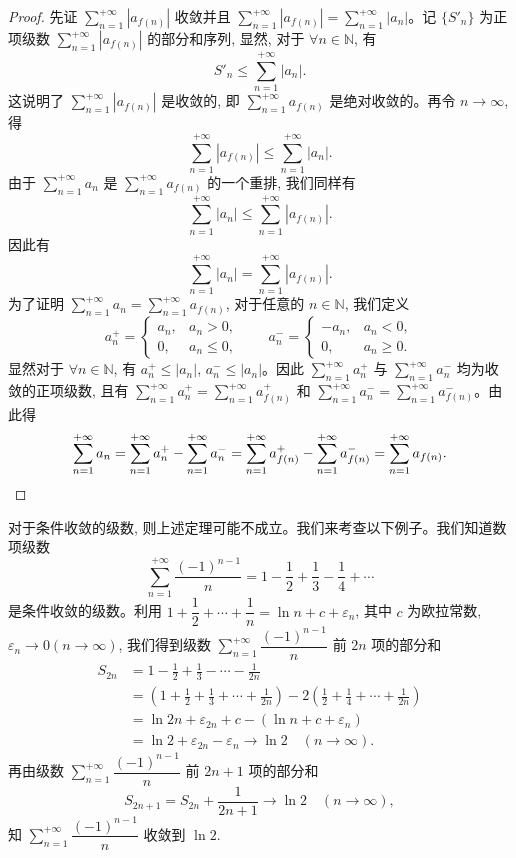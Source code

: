\begin{proof}
先证 $\sum\limits_{n=1}^{+\infty}|a_{f(n)}|$ 收敛并且 $\sum\limits_{n=1}^{+\infty}|a_{f(n)}|=\sum\limits_{n=1}^{+\infty}|a_n|$。记 $\{S'_n\}$ 为正项级数 $\sum\limits_{n=1}^{+\infty}|a_{f(n)}|$ 的部分和序列, 显然, 对于 $\forall n\in\mathbb{N}$, 有
\[
  S'_n\leq\sum_{n=1}^{+\infty}|a_n|.
\]
这说明了 $\sum\limits_{n=1}^{+\infty}|a_{f(n)}|$ 是收敛的, 即 $\sum\limits_{n=1}^{+\infty}a_{f(n)}$ 是绝对收敛的。再令 $n\to\infty$, 得
\[
  \sum_{n=1}^{+\infty}|a_{f(n)}|\leq\sum_{n=1}^{+\infty}|a_n|.
\]
由于 $\sum\limits_{n=1}^{+\infty}a_n$ 是 $\sum\limits_{n=1}^{+\infty}a_{f(n)}$ 的一个重排, 我们同样有
\[
  \sum_{n=1}^{+\infty}|a_n|\leq\sum_{n=1}^{+\infty}|a_{f(n)}|.
\]
因此有
\[
  \sum_{n=1}^{+\infty}|a_n|=\sum_{n=1}^{+\infty}|a_{f(n)}|.
\]
为了证明 $\sum\limits_{n=1}^{+\infty}a_n=\sum\limits_{n=1}^{+\infty}a_{f(n)}$, 对于任意的 $n\in\mathbb{N}$, 我们定义
\begin{equation}
  a_n^+=
  \begin{cases}
    a_n, & a_n>0,\\
    0, & a_n\leq0,
  \end{cases}
  \qquad
  a_n^-=
  \begin{cases}
    -a_n, & a_n<0,\\
    0, & a_n\geq0.
  \end{cases}
  \label{eq:ma-9-4-1}
\end{equation}
显然对于 $\forall n\in\mathbb{N}$, 有 $a_n^+\leq|a_n|$, $a_n^-\leq|a_n|$。因此 $\sum\limits_{n=1}^{+\infty}a_n^+$ 与 $\sum\limits_{n=1}^{+\infty}a_n^-$ 均为收敛的正项级数, 且有 $\sum\limits_{n=1}^{+\infty}a_n^+=\sum\limits_{n=1}^{+\infty}a_{f(n)}^+$ 和 $\sum\limits_{n=1}^{+\infty}a_n^-=\sum\limits_{n=1}^{+\infty}a_{f(n)}^-$。由此得
\[
  \sum_{n=1}^{+\infty}a_n
  =\sum_{n=1}^{+\infty}a_n^+-\sum_{n=1}^{+\infty}a_n^-
  =\sum_{n=1}^{+\infty}a_{f(n)}^+-\sum_{n=1}^{+\infty}a_{f(n)}^-
  =\sum_{n=1}^{+\infty}a_{f(n)}.
\qedhere
\]
\end{proof}


对于条件收敛的级数, 则上述定理可能不成立。我们来考查以下例子。我们知道数项级数
\[
  \sum_{n=1}^{+\infty}\frac{(-1)^{n-1}}{n}=1-\frac12+\frac13-\frac14+\cdots
\]
是条件收敛的级数。利用 $1+\dfrac12+\cdots+\dfrac1n=\ln n+c+\varepsilon_n$, 其中 $c$ 为欧拉常数, $\varepsilon_n\to0(n\to\infty)$, 我们得到级数 $\sum\limits_{n=1}^{+\infty}\dfrac{(-1)^{n-1}}{n}$ 前 $2n$ 项的部分和
\[
\begin{aligned}
  S_{2n}
  &=1-\frac12+\frac13-\cdots-\frac1{2n}\\
  &=\left(1+\frac12+\frac13+\cdots+\frac1{2n}\right)-2\left(\frac12+\frac14+\cdots+\frac1{2n}\right)\\
  &=\ln2n+\varepsilon_{2n}+c-(\ln n+c+\varepsilon_n)\\
  &=\ln2+\varepsilon_{2n}-\varepsilon_n\to\ln2\quad(n\to\infty).
\end{aligned}
\]
再由级数 $\sum\limits_{n=1}^{+\infty}\dfrac{(-1)^{n-1}}{n}$ 前 $2n+1$ 项的部分和
\[
  S_{2n+1}=S_{2n}+\frac1{2n+1}\to\ln2\quad(n\to\infty),
\]
知 $\sum\limits_{n=1}^{+\infty}\dfrac{(-1)^{n-1}}{n}$ 收敛到 $\ln2$.

